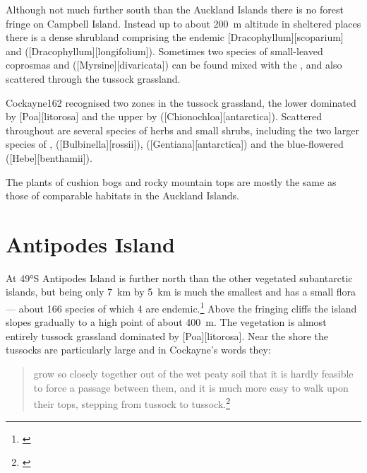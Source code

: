 Although not much further south than the Auckland Islands there is no forest fringe on Campbell Island.
Instead up to about \SI{200}{\metre} altitude in sheltered places there is a dense shrubland comprising the endemic [Dracophyllum][scoparium] and  ([Dracophyllum][longifolium]).
Sometimes two species of small-leaved coprosmas and  ([Myrsine][divaricata]) can be found mixed with the , and also scattered through the tussock grassland.

Cockayne162 recognised two zones in the tussock grassland, the lower dominated by [Poa][litorosa] and the upper by  ([Chionochloa][antarctica]).
Scattered throughout are several species of herbs and small shrubs, including the two larger species of ,  ([Bulbinella][rossii]),  ([Gentiana][antarctica]) and the blue-flowered  ([Hebe][benthamii]).

The plants of cushion bogs and rocky mountain tops are mostly the same as those of comparable habitats in the Auckland Islands.

\section{Antipodes Island}

At \ang{49}S Antipodes Island is further north than the other vegetated subantarctic islands, but being only \SI{7}{\kilo\metre} by \SI{5}{\kilo\metre} is much the smallest and has a small flora --- about 166 species of which 4 are endemic.\footnote{\cite{williams1982species}}
Above the fringing cliffs the island slopes gradually to a high point of about \SI{400}{\metre}.
The vegetation is almost entirely tussock grassland dominated by [Poa][litorosa].
Near the shore the tussocks are particularly large and in Cockayne's words they:

\begin{quote}
	grow so closely together out of the wet peaty soil that it is hardly feasible to force a passage between them, and it is much more easy to walk upon their tops, stepping from tussock to tussock.\footnote{\cite{cockayne1909ecological}}
\end{quote}

